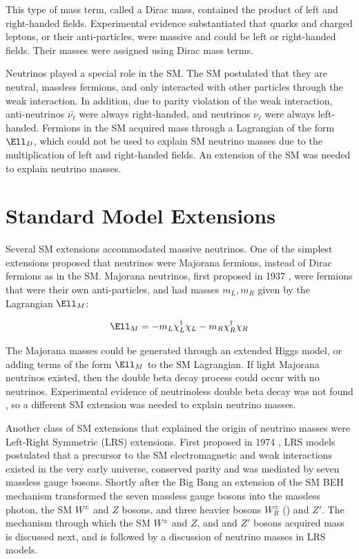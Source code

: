 This type of mass term, called a Dirac mass, contained the product of left and right-handed fields.  Experimental 
evidence substantiated that quarks and charged leptons, or their anti-particles, were massive and could be left or right-handed 
fields.  Their masses were assigned using Dirac mass terms.

Neutrinos played a special role in the SM.  The SM postulated that they are neutral, massless fermions, and only interacted 
with other particles through the weak interaction.  In addition, due to parity violation of the weak interaction, 
anti-neutrinos $\bar{\nu_{\ell}}$ were always right-handed, and neutrinos $\nu_{\ell}$ were always left-handed.  Fermions in 
the SM acquired mass through a Lagrangian of the form $\Ell_{D}$, which could not be used to explain SM neutrino masses 
due to the multiplication of left and right-handed fields.  An extension of the SM was needed to explain neutrino masses.


\section{Standard Model Extensions}
\label{sec:lrsExtensions}
Several SM extensions accommodated massive neutrinos.  One of the simplest extensions proposed that neutrinos 
were Majorana fermions, instead of Dirac fermions as in the SM.  Majorana neutrinos, first proposed 
in 1937 \cite{majoranaTheory}, were fermions that were their own anti-particles, and had masses 
$m_{L},m_{R}$ given by the Lagrangian $\Ell_{M}$:

\begin{equation}
	\Ell_{M} = -m_{L}\chi^{\dagger}_{L}\chi_{L} - m_{R}\chi^{\dagger}_{R}\chi_{R}
\end{equation}

The Majorana masses could be generated through an extended Higgs model, or adding terms of the form $\Ell_{M}$ 
to the SM Lagrangian.  If light Majorana neutrinos existed, then the double beta decay process could occur 
with no neutrinos.  Experimental evidence of neutrinoless double beta decay was not found 
\cite{igexDblBetaDecay,gerdaDblBetaDecay}, so a different SM extension was needed to explain neutrino masses.

Another class of SM extensions that explained the origin of neutrino masses were Left-Right Symmetric (LRS) extensions.  
First proposed in 1974 \cite{earlyLRSModel}, LRS models postulated that a precursor to the SM electromagnetic and weak interactions 
existed in the very early universe, conserved parity and was mediated by seven massless gauge bosons.  
Shortly after the Big Bang an extension of the SM BEH mechanism transformed the seven massless gauge bosons 
into the massless photon, the SM $W^{\pm}$ and $Z$ bosons, and three heavier bosons $W^{\pm}_{R}$ (\WR) and $Z'$.  
The mechanism through which the SM $W^{\pm}$ and $Z$, and \WR and $Z'$ bosons acquired mass is discussed next, and 
is followed by a discussion of neutrino masses in LRS models.

